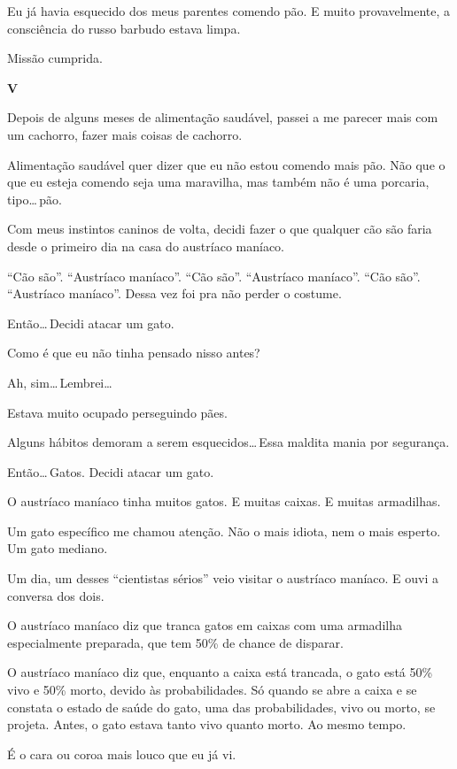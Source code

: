 Eu já havia esquecido dos meus parentes comendo pão. E muito provavelmente, a consciência do russo barbudo estava limpa.

Missão cumprida.

\begin{center}
{\Large \textbf{V}}
\end{center}

Depois de alguns meses de alimentação saudável, passei a me parecer mais com um cachorro, fazer mais coisas de cachorro.

Alimentação saudável quer dizer que eu não estou comendo mais pão. Não que o que eu esteja comendo seja uma maravilha, mas também não é uma porcaria, tipo\ldots\,pão.

Com meus instintos caninos de volta, decidi fazer o que qualquer cão são faria desde o primeiro dia na casa do austríaco maníaco.

``Cão são''. ``Austríaco maníaco''. ``Cão são''. ``Austríaco maníaco''. ``Cão são''. ``Austríaco maníaco''. Dessa vez foi pra não perder o costume.

Então\ldots\,Decidi atacar um gato.

Como é que eu não tinha pensado nisso antes?

Ah, sim\ldots\,Lembrei\ldots

Estava muito ocupado perseguindo pães.

Alguns hábitos demoram a serem esquecidos\ldots\,Essa maldita mania por segurança.

Então\ldots\,Gatos. Decidi atacar um gato.

O austríaco maníaco tinha muitos gatos. E muitas caixas. E muitas armadilhas.

Um gato específico me chamou atenção. Não o mais idiota, nem o mais esperto. Um gato mediano.

Um dia, um desses ``cientistas sérios'' veio visitar o austríaco maníaco. E ouvi a conversa dos dois.

O austríaco maníaco diz que tranca gatos em caixas com uma armadilha especialmente preparada, que tem 50\% de chance de disparar.

O austríaco maníaco diz que, enquanto a caixa está trancada, o gato está 50\% vivo e 50\% morto, devido às probabilidades. Só quando se abre a caixa e se constata o estado de saúde do gato, uma das probabilidades, vivo ou morto, se projeta. Antes, o gato estava tanto vivo quanto morto. Ao mesmo tempo.

É o cara ou coroa mais louco que eu já vi.

